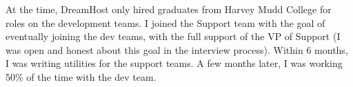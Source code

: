 %
%
At the time, DreamHost only hired graduates from Harvey Mudd College for roles on the development teams. I joined the
Support team with the goal of eventually joining the dev teams, with the full support of the VP of Support (I was open
and honest about this goal in the interview process). Within 6 months, I was writing utilities for the support teams. A
few months later, I was working 50\% of the time with the dev team.
